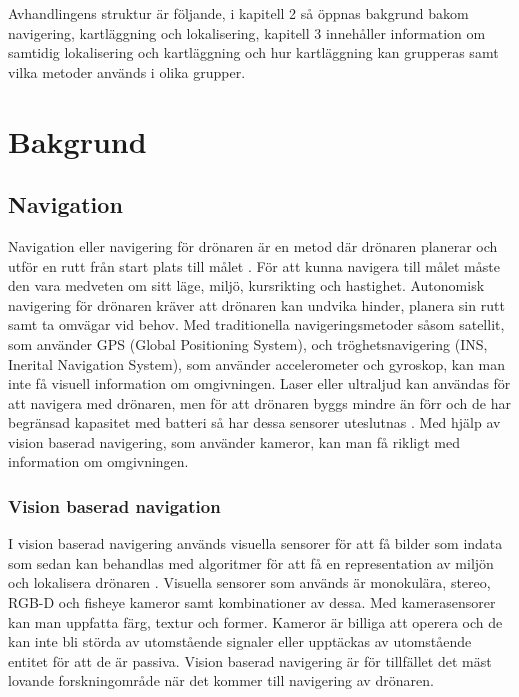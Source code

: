 Avhandlingens struktur är följande, i kapitell 2 så öppnas bakgrund bakom navigering, kartläggning och lokalisering, kapitell 3 innehåller information om samtidig lokalisering och kartläggning och hur kartläggning kan grupperas samt vilka metoder används i olika grupper. 

\chapter{Bakgrund}

\section{Navigation}

Navigation eller navigering för drönaren är en metod där drönaren planerar och utför en rutt från start plats till målet \citep{geospatial}. För att kunna navigera till målet måste den vara medveten om sitt läge, miljö, kursrikting och hastighet. Autonomisk navigering för drönaren kräver att drönaren kan undvika hinder, planera sin rutt samt ta omvägar vid behov. Med traditionella navigeringsmetoder såsom satellit, som använder GPS (Global Positioning System), och tröghetsnavigering (INS, Inerital Navigation System), som använder accelerometer och gyroskop, kan man inte få visuell information om omgivningen. Laser eller ultraljud kan användas för att navigera med drönaren, men för att drönaren byggs mindre än förr och de har begränsad kapasitet med batteri så har dessa sensorer uteslutnas \citep{6385934}. Med hjälp av vision baserad navigering, som använder kameror, kan man få rikligt med information om omgivningen. 

\subsection{Vision baserad navigation}

I vision baserad navigering används visuella sensorer för att få bilder som indata som sedan kan behandlas med algoritmer för att få en representation av miljön och lokalisera drönaren \citep{geospatial}. Visuella sensorer som används är monokulära, stereo, RGB-D och fisheye kameror samt kombinationer av dessa. Med kamerasensorer kan man uppfatta färg, textur och former. Kameror är billiga att operera och de kan inte bli störda av utomstående signaler eller upptäckas av utomstående entitet för att de är passiva. Vision baserad navigering är för tillfället det mäst lovande forskningområde när det kommer till navigering av drönaren.

